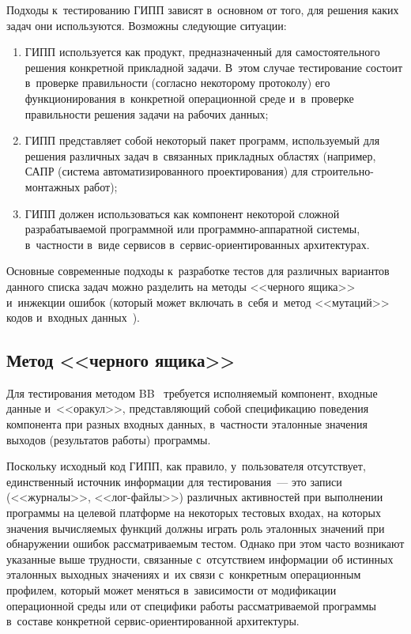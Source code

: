 \begin{multicols}{2}
\vspace*{-2pt}
    
    Подходы к~тестированию ГИПП зависят в~основном от того, для 
решения каких задач они используются. Возможны следующие ситуации:
    \begin{enumerate}[(1)]
    \item ГИПП используется как продукт, предназначенный для 
самостоятельного решения конкретной прикладной задачи. В~этом случае 
тестирование состоит в~проверке правильности (согласно некоторому 
протоколу) его функционирования в~конкретной операционной среде 
и~в~проверке правильности решения задачи на рабочих данных;
    \item ГИПП представляет собой некоторый пакет программ, 
используемый для решения различных задач в~связанных прикладных 
областях (например, САПР (система автоматизированного
проектирования) для стро\-и\-тель\-но-мон\-таж\-ных работ);
    \item ГИПП должен использоваться как компонент некоторой сложной 
разрабатываемой программной или программно-аппаратной системы, 
в~частности в~виде сервисов в~сер\-вис-ори\-ен\-ти\-ро\-ван\-ных 
архитектурах.
    \end{enumerate}
    
    Основные современные подходы к~разработке тестов для различных 
вариантов данного списка задач можно разделить на методы <<черного 
ящика>>  и~инжекции ошибок (который может включать в~себя и~метод 
<<мутаций>> кодов и~входных данных~\cite{8-bf}).

\vspace*{-3pt}
    
    \subsection{Метод <<черного ящика>>}
    
    \vspace*{-1pt}
    
    Для тестирования методом BB~\cite{9-bf} требуется исполняемый 
компонент, входные данные и~<<оракул>>, представляющий собой 
спецификацию поведения компонента при разных входных данных, 
в~частности эталонные значения выходов (результатов работы) программы.
    
    Поскольку исходный код ГИПП, как правило, у~пользователя 
отсутствует, единственный источник информации для тестирования~--- это 
записи (<<журналы>>, <<лог-фай\-лы>>) различных активностей при 
выполнении программы на целевой платформе на некоторых тестовых 
входах, на которых значения вычисляемых функций должны играть роль 
эталонных значений при обнаружении ошибок рассматриваемым тестом.
    Однако при этом часто возникают указанные выше трудности, 
связанные с~отсутствием информации об истинных эталонных выходных 
значениях и~их связи с~конкретным операционным профилем, который может 
меняться в~зависимости от модификации операционной среды или от 
специфики работы рассматриваемой программы в~составе конкретной  
сер\-вис-ори\-ен\-ти\-ро\-ван\-ной архитектуры.
    

\end{multicols}
